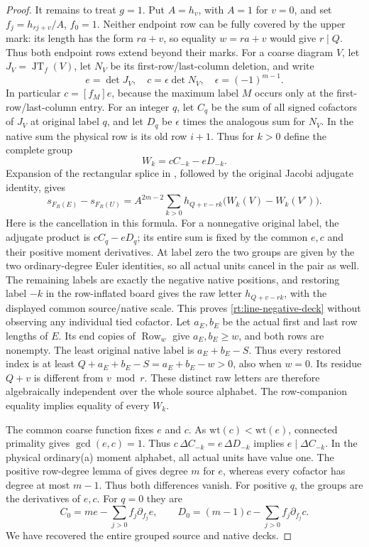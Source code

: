 \documentclass[11pt,a4paper]{amsart}
\numberwithin{equation}{section}
\theoremstyle{plain}
\theoremstyle{definition}
\newcommand{\Row}{\operatorname{Row}}
\newcommand{\JT}{\operatorname{JT}}
\begin{document}
\begin{proof}
It remains to treat \(g=1\).  Put \(A=h_v\), with \(A=1\) for
\(v=0\), and set \(f_j=h_{rj+v}/A\), \(f_0=1\).
Neither endpoint row can be fully covered by the upper mark:
its length has the form \(ra+v\), so equality \(w=ra+v\) would
give \(r\mid Q\).  Thus both endpoint rows extend beyond their marks.
For a coarse diagram \(V\), let \(J_V=\JT_f(V)\), let \(N_V\) be its
first-row/last-column deletion, and write
\[
 e=\det J_V,\quad c=\epsilon\det N_V,\quad
 \epsilon=(-1)^{m-1}.
\]
In particular \(c=[f_M]e\), because the maximum label \(M\) occurs
only at the first-row/last-column entry.
For an integer \(q\), let \(C_q\) be the sum of all signed cofactors
of \(J_V\) at original label \(q\), and let \(D_q\) be \(\epsilon\)
times the analogous sum for \(N_V\).  In the native sum the physical
row is its old row \(i+1\).  Thus for \(k>0\) define the complete group
\[
 W_k=cC_{-k}-eD_{-k}.
\]
Expansion of the rectangular splice in
, followed by the original Jacobi
adjugate identity, gives
\begin{equation}\label{rt:line-negative-deck}
 s_{F_R(E)}-s_{F_R(U)}
 =A^{2m-2}\sum_{k>0}h_{Q+v-rk}
                 \bigl(W_k(V)-W_k(V')\bigr).
\end{equation}
Here is the cancellation in this formula.  For a nonnegative original
label, the adjugate product is \(cC_q-eD_q\); its entire sum is fixed by
the common \(e,c\) and their positive moment derivatives.  At label zero
the two groups are given by the two ordinary-degree Euler identities,
so all actual units cancel in the pair as well.  The remaining labels
are exactly the negative native positions, and restoring label \(-k\)
in the row-inflated board gives the raw letter \(h_{Q+v-rk}\), with
the displayed common source/native scale.  This proves
\eqref{rt:line-negative-deck} without observing any individual tied
cofactor.  Let \(a_E,b_E\) be the actual first and last row lengths
of \(E\).  Its end copies of \(\Row_w\) give \(a_E,b_E\ge w\),
and both rows are nonempty.  The least original native label
is \(a_E+b_E-S\).  Thus every restored index is at least
\(Q+a_E+b_E-S=a_E+b_E-w>0\), also when \(w=0\).
Its residue \(Q+v\) is different from \(v\bmod r\).  These distinct raw
letters are therefore algebraically independent over the whole source
alphabet.  The row-companion equality implies equality of every \(W_k\).

The common coarse function fixes \(e\) and \(c\).
As \(\mathrm{wt}(c)<\mathrm{wt}(e)\), connected primality gives
\(\gcd(e,c)=1\).
Thus \(c\,\Delta C_{-k}=e\,\Delta D_{-k}\) implies
\(e\mid\Delta C_{-k}\).  In the physical ordinary(a) moment alphabet,
all actual units have value one.  The positive row-degree lemma of
\cite{Shields2026Coframes} gives degree \(m\) for \(e\), whereas every
cofactor has degree at most \(m-1\).  Thus both differences vanish.
For positive \(q\), the groups are the derivatives of \(e,c\).
For \(q=0\) they are
\[
 C_0=me-\sum_{j>0}f_j\partial_{f_j}e,\qquad
 D_0=(m-1)c-\sum_{j>0}f_j\partial_{f_j}c.
\]
We have recovered the entire grouped source and native decks.


\end{proof}
\end{document}
